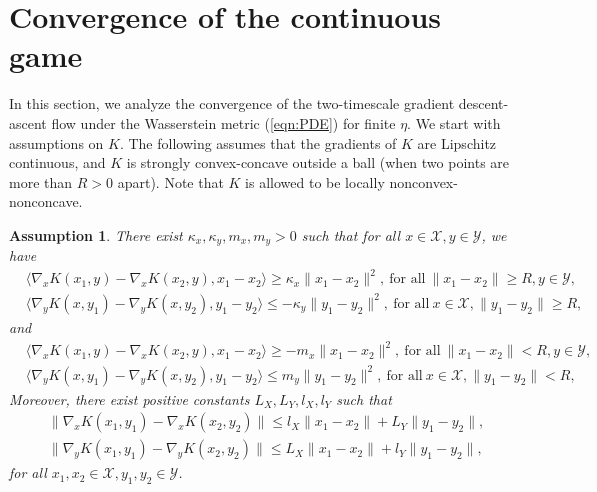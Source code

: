 \documentclass[11pt]{article}
\newtheorem{assumption}{Assumption}
\newcommand{\1}{\mathds{1}}
\begin{document}
\section{Convergence of the continuous game}\label{sec:infinite-dim}
In this section, we analyze the convergence of the two-timescale gradient descent-ascent flow under the Wasserstein metric (\ref{eqn:PDE}) for finite $\eta$. We start with assumptions on $K$. The following assumes that the gradients of $K$ are Lipschitz continuous, and $K$ is strongly convex-concave outside a ball (when two points are more than $R>0$ apart). Note that $K$ is allowed to be locally nonconvex-nonconcave. 
\begin{assumption}\label{assump:K}
    There exist $\kappa_x, \kappa_y, m_x, m_y>0$ such that for all $x\in\mathcal{X}, y\in\mathcal{Y}$, we have
    \begin{equation}\label{assump:cond3_1}
        \begin{aligned}
            &\langle \nabla_x K(x_1, y)- \nabla_x K(x_2, y), x_1-x_2\rangle \geq \kappa_x \|x_1-x_2\|^2, ~\text{for all}~\|x_1 -x_2\|\geq R, y\in\mathcal{Y},\\
            &\langle \nabla_y K(x, y_1)- \nabla_y K(x, y_2), y_1-y_2\rangle \leq -\kappa_y \|y_1-y_2\|^2, ~\text{for all}~x\in\mathcal{X}, \|y_1-y_2\|\geq R,
        \end{aligned}
    \end{equation}
    and 
        \begin{equation}
        \begin{aligned}
            &\langle \nabla_x K(x_1, y)- \nabla_x K(x_2, y), x_1-x_2\rangle \geq -m_x \|x_1-x_2\|^2, ~\text{for all}~\|x_1 -x_2\|<R, y\in\mathcal{Y},\\
            &\langle \nabla_y K(x, y_1)- \nabla_y K(x, y_2), y_1-y_2\rangle \leq m_y \|y_1-y_2\|^2, ~\text{for all}~x\in\mathcal{X}, \|y_1-y_2\|< R,
        \end{aligned}
    \end{equation}
Moreover, there exist positive constants $L_{X}, L_{Y}, l_{X}, l_{Y}$ such that
\begin{equation}\label{assump:cond3_2}
    \begin{aligned}
      &\|\nabla_x K(x_1, y_1)- \nabla_x K(x_2, y_2)\| \leq l_X\|x_1-x_2\|+L_Y \|y_1-y_2\|, \\
       &\|\nabla_y K(x_1, y_1)- \nabla_y K(x_2, y_2)\| \leq L_X \|x_1-x_2\|+l_Y \|y_1-y_2\|,
    \end{aligned}
\end{equation}
for all $x_1,x_2\in\mathcal{X}, y_1, y_2\in\mathcal{Y}$.
\end{assumption}
\end{document}
